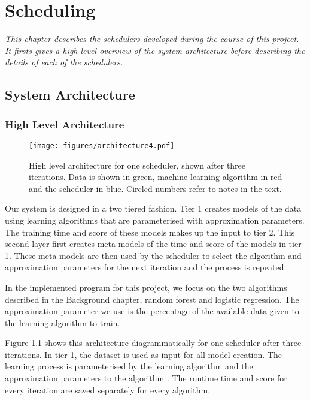 \documentclass[a4paper,12pt,twoside,openright]{report}
\begin{document}
\chapter{Scheduling} 
\label{ch:scheduling}
\textit{This chapter describes the schedulers developed during the course of this project. It firsts gives a high level overview of the system architecture before describing the details of each of the schedulers.}

\section{System Architecture}

\subsection{High Level Architecture}
\begin{figure}[p]
    \centerline{\texttt{[image: figures/architecture4.pdf]}}
  \caption{High level architecture for one scheduler, shown after three iterations. Data is shown in green, machine learning algorithm in red and the scheduler in blue. Circled numbers refer to notes in the text.}
    \label{architecture}
\end{figure}


Our system is designed in a two tiered fashion. Tier 1 creates models of the data using learning algorithms that are parameterised with approximation parameters. The training time and score of these models makes up the input to tier 2. This second layer first creates meta-models of the time and score of the models in tier 1. These meta-models are then used by the scheduler to select the algorithm and approximation parameters for the next iteration and the process is repeated.

In the implemented program for this project, we focus on the two algorithms described in the Background chapter, random forest and logistic regression. The approximation parameter we use is the percentage of the available data given to the learning algorithm to train.

Figure \ref{architecture} shows this architecture diagrammatically for one scheduler after three iterations. In tier 1, the dataset \raisebox{.5pt}{\textcircled{\raisebox{-.9pt} {1}}} is used as input for all model creation. The learning process is parameterised by the learning algorithm and the approximation parameters to the algorithm \raisebox{.5pt}{\textcircled{\raisebox{-.9pt} {2}}}. The runtime time and score for every iteration are saved \raisebox{.5pt}{\textcircled{\raisebox{-.9pt} {3}}} separately for every algorithm.
\end{document}
